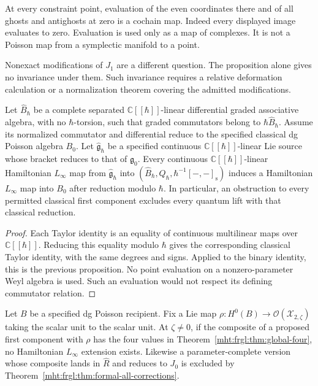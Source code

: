 At every constraint point, evaluation of the even coordinates
there and of all ghosts and antighosts at zero is a cochain
map.  Indeed every displayed image evaluates to zero.
Evaluation is used only as a map of complexes. It is not a
Poisson map from a symplectic manifold to a point.

Nonexact modifications of $J_1$ are a different question.
The proposition alone gives no invariance under them.  Such
invariance requires a relative deformation calculation or a
normalization theorem covering the admitted modifications.

\begin{proposition}
\label{mht:frgl:prop:quantum-specialization-obstruction}
Let $\widehat B_\hbar$ be a complete separated
$\mathbb C[[\hbar]]$-linear differential graded associative
algebra, with no $\hbar$-torsion, such that graded
commutators belong to $\hbar\widehat B_\hbar$.
Assume its normalized commutator and differential reduce to
the specified classical dg Poisson algebra $B_0$.
Let $\widehat{\mathfrak g}_\hbar$ be a specified continuous
$\mathbb C[[\hbar]]$-linear Lie source whose bracket reduces to
that of $\mathfrak g_0$. Every continuous
$\mathbb C[[\hbar]]$-linear Hamiltonian
$L_\infty$ map from $\widehat{\mathfrak g}_\hbar$ into
$(\widehat B_\hbar,Q_\hbar,\hbar^{-1}[-,-]_{\mathrm s})$
induces a Hamiltonian $L_\infty$ map into $B_0$ after
reduction modulo $\hbar$.  In particular, an obstruction to
every permitted classical first component excludes every
quantum lift with that classical reduction.
\end{proposition}

\begin{proof}
Each Taylor identity is an equality of continuous multilinear
maps over $\mathbb C[[\hbar]]$.  Reducing this equality
modulo $\hbar$ gives the corresponding classical Taylor
identity, with the same degrees and signs.  Applied to the
binary identity, this is the previous proposition.
No point evaluation on a nonzero-parameter Weyl algebra is
used.  Such an evaluation would not respect its defining
commutator relation.
\end{proof}

\begin{corollary}\label{mht:frgl:cor:recipient-obstruction}
Let $B$ be a specified dg Poisson recipient. Fix a Lie map
$\rho:H^0(B)\longrightarrow\mathcal O(\mathcal X_{2,\zeta})$
taking the scalar unit to the scalar unit.
At $\zeta\ne0$, if the composite of a proposed first component with
$\rho$ has the four values in Theorem~\ref{mht:frgl:thm:global-four}, no Hamiltonian
$L_\infty$ extension exists. Likewise a parameter-complete version
whose composite lands in $\widehat R$ and reduces to $J_0$ is
excluded by Theorem~\ref{mht:frgl:thm:formal-all-corrections}.
\end{corollary}

